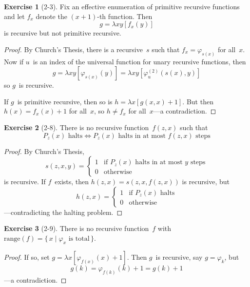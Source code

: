 \documentclass[letterpaper]{article}
\newcommand{\ran}{\mathrm{range}}
\theoremstyle{definition}
\newtheorem*{exer}{Exercise}
\theoremstyle{remark}
\theoremstyle{direction}
\begin{document}
\begin{exer}[2-3]
Fix an effective enumeration of primitive recursive functions and let $f_x$ denote the $(x+1)$-th function. Then
$$g=\lambda xy[f_x(y)]$$
is recursive but not primitive recursive.
\end{exer}
\begin{proof}
By Church's Thesis, there is a recursive~$s$ such that $f_x=\varphi_{s(x)}$ for all~$x$. Now if $u$~is an index of the universal function for unary recursive functions, then
$$g=\lambda xy[\varphi_{s(x)}(y)]=\lambda xy[\varphi_u^{(2)}(s(x),y)]$$
so $g$~is recursive.

If $g$~is primitive recursive, then so is $h=\lambda x[g(x,x)+1]$. But then $h(x)=f_x(x)+1$ for all~$x$, so $h\ne f_x$ for all~$x$---a contradiction.
\end{proof}

\begin{exer}[2-8]
There is no recursive function~$f(z,x)$ such that
$$P_z(x)\text{ halts}\iff P_z(x)\text{ halts in at most }f(z,x)\text{ steps}$$
\end{exer}
\begin{proof}
By Church's Thesis,
$$s(z,x,y)=
\begin{cases}
1&\text{if }P_z(x)\text{ halts in at most }y\text{ steps}\\
0&\text{otherwise}
\end{cases}$$
is recursive. If $f$~exists, then $h(z,x)=s(z,x,f(z,x))$ is recursive, but
$$h(z,x)=
\begin{cases}
1&\text{if }P_z(x)\text{ halts}\\
0&\text{otherwise}
\end{cases}$$
---contradicting the halting problem.
\end{proof}

\begin{exer}[2-9]
There is no recursive function~$f$ with $\ran(f)=\{\,x\mid\varphi_x\text{ is total}\,\}$.
\end{exer}
\begin{proof}
If so, set $g=\lambda x[\varphi_{f(x)}(x)+1]$. Then $g$~is recursive, say $g=\varphi_k$, but
$$g(k)=\varphi_{f(k)}(k)+1=g(k)+1$$
---a contradiction.
\end{proof}
\end{document}
